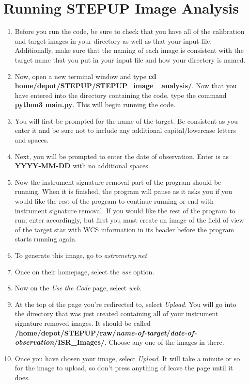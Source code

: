 \documentclass[11pt]{report}
\begin{document}
\chapter{Running STEPUP Image Analysis}
\begin{enumerate}
\item Before you run the code, be sure to check that you have all of the calibration and target images in your directory as well as that your input file. Additionally, make sure that the naming of each image is consistent with the target name that you put in your input file and how your directory is named.
\item Now, open a new terminal window and type {\bf cd home/depot/STEPUP/STEPUP\_image} {\bf\_analysis/}. Now that you have entered into the directory containing the code, type the command {\bf python3 main.py}. This will begin running the code.
\item You will first be prompted for the name of the target. Be consistent as you enter it and be sure not to include any additional capital/lowercase letters and spaces.
\item Next, you will be prompted to enter the date of observation. Enter is as {\bf YYYY-MM-DD} with no additional spaces.
\item Now the instrument signature removal part of the program should be running. When it is finished, the program will pause as it asks you if you would like the rest of the program to continue running or end with instrument signature removal. If you would like the rest of the program to run, enter accordingly, but first you must create an image of the field of view of the target star with WCS information in its header before the program starts running again.\
\item To generate this image, go to \emph{astrometry.net}
\item Once on their homepage, select the \emph{use} option. 
\item Now on the \emph{Use the Code} page, select \emph{web}.
\item At the top of the page you're redirected to, select \emph{Upload}. You will go into the directory that was just created containing all of your instrument signature removed images. It should be called {\bf /home/depot/STEPUP/raw/\emph{name-of-target}/\emph{date-of-observation}/ISR\_Images/}. Choose any one of the images in there.
\item Once you have chosen your image, select \emph{Upload}. It will take a minute or so for the image to upload, so don't press anything of leave the page until it does.

\end{enumerate}
\end{document}
